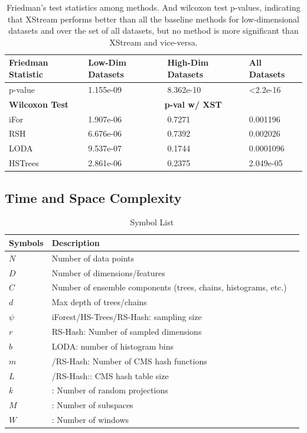 \begin{table}[]
\centering
\begin{tabular}{l|lll}
\hline	\hline
\textbf{Friedman Statistic} & \textbf{Low-Dim Datasets} & \textbf{High-Dim Datasets} & \textbf{All Datasets}    \\ \hline
p-value            & 1.155e-09        & 8.362e-10         & \textless2.2e-16 \\ \hline \hline
\textbf{Wilcoxon Test}      & \multicolumn{3}{c}{\textbf{p-val w/ XST}}                        \\ 	\hline
iFor               & 1.907e-06         & 0.7271         &  0.001196       \\
RSH                & 6.676e-06         & 0.7392         & 0.002026        \\
LODA               & 9.537e-07         & 0.1744         & 0.0001096            \\
HSTrees            & 2.861e-06        & 0.2375          &  2.049e-05	\\	\hline
\end{tabular}
\caption{Friedman's test statistics among methods. And wilcoxon test p-values, indicating that XStream performs better than all the baseline methods for low-dimensional datasets and over the set of all datasets, but no method is more significant than XStream and vice-versa.}
\label{my-label}
\end{table}

\subsection{Time and Space Complexity}
%
%

\begin{table}[ht!]
	\caption{Symbol List}
	\centering
	\begin{tabular}{lll}
		\toprule
		\textbf{Symbols} & \textbf{Description}	\\	\hline
		$N$ & Number of data points	\\	\hline
		$D$ & Number of dimensions/features	\\	\hline
		$C$ & Number of ensemble components (trees, chains, histograms, etc.)	\\	\hline
		$d$ & Max depth of trees/chains	\\	\hline
		$\psi$ & iForest/HS-Trees/RS-Hash: sampling size	\\	\hline
		$r$ & RS-Hash: Number of sampled dimensions	\\
		$b$ & LODA: number of histogram bins	\\	\hline
		$m$ & \method/RS-Hash: Number of CMS hash functions	\\
		$L$ & \method/RS-Hash:: CMS hash table size	\\	\hline
		$k$ & \method: Number of random projections	\\
		$M$ & \method: Number of subspaces	\\
		$W$ & \method: Number of windows	\\
		\bottomrule
	\end{tabular}

\end{table}

